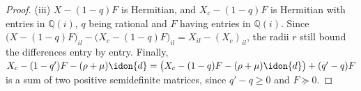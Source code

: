 \begin{proof}
(iii) $X-(1-q)F$ is Hermitian, and $X_c-(1-q)F$ is Hermitian with entries in
$\mathbb{Q}(i)$, $q$ being rational and $F$ having entries in
$\mathbb{Q}(i)$. Since
$\big(X-(1-q)F\big)_{il}-\big(X_c-(1-q)F\big)_{il}=X_{il}-(X_c)_{il}$, the
radii $r$ still bound the differences entry by entry. Finally,
$X_c-(1-q')F-(\rho+\mu)\idon{d}
=\big(X_c-(1-q)F-(\rho+\mu)\idon{d}\big)+(q'-q)F$ is a sum of two positive
semidefinite matrices, since $q'-q\ge0$ and $F\succeq0$.
\end{proof}
